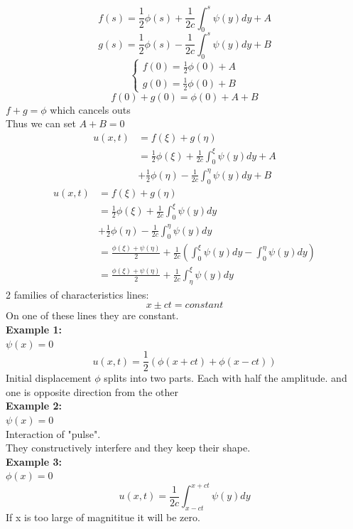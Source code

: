 \documentclass{article}
\begin{document}
$$f(s) = \frac{1}{2} \phi(s) + \frac{1}{2c} \int_0^s \psi(y) dy + A$$
$$g(s) = \frac{1}{2} \phi(s) - \frac{1}{2c} \int_0^s \psi(y) dy + B$$
$$
\begin{cases}
    f(0) = \frac{1}{2} \phi(0) + A\\
    g(0) = \frac{1}{2} \phi(0) + B
\end{cases}
$$
$$
f(0) + g(0) = \phi(0) + A + B
$$
$f+g = \phi$ which cancels outs\\
Thus we can set $A + B= 0 $\\
\begin{align*}
    u(x,t) &= f(\xi) + g(\eta)\\
    &= \frac{1}{2}\phi(\xi) + \frac{1}{2c} \int_0^\xi \psi(y) dy + A \\
    &+ \frac{1}{2}\phi(\eta) - \frac{1}{2c} \int_0^\eta \psi(y) dy + B
\end{align*}
\begin{align*}
    u(x,t) &= f(\xi) + g(\eta)\\
    &= \frac{1}{2}\phi(\xi) + \frac{1}{2c} \int_0^\xi \psi(y) dy  \\
    &+ \frac{1}{2}\phi(\eta) - \frac{1}{2c} \int_0^\eta \psi(y) dy\\
    &= \frac{\phi(\xi) + \psi(\eta)}{2} + \frac{1}{2c} \left( \int_0^\xi \psi(y) dy - \int_0^\eta \psi(y) dy \right)\\
    &= \frac{\phi(\xi) + \psi(\eta)}{2} + \frac{1}{2c} \int_{\eta}^{\xi} \psi(y) dy
\end{align*}
2 families of characteristics lines:\\
$$ x \pm ct = constant$$
On one of these lines they are constant.\\
\textbf{Example 1: }\\
$\psi(x) = 0$\\
$$ u(x,t) = \frac{1}{2} \left( \phi(x + ct) + \phi(x - ct) \right)$$
Initial displacement $\phi$ splits into two parts. Each with half the amplitude. and one is opposite direction from the other\\
\textbf{Example 2: }\\
$\psi(x) = 0$\\
Interaction of "pulse".\\
They constructively interfere and they keep their shape.\\
\textbf{Example 3: }\\
$\phi(x) = 0$\\
$$ u(x,t) = \frac{1}{2c} \int_{x - ct}^{x + ct} \psi(y) dy$$
If x is too large of magnititue it will be zero.\\
\end{document}
